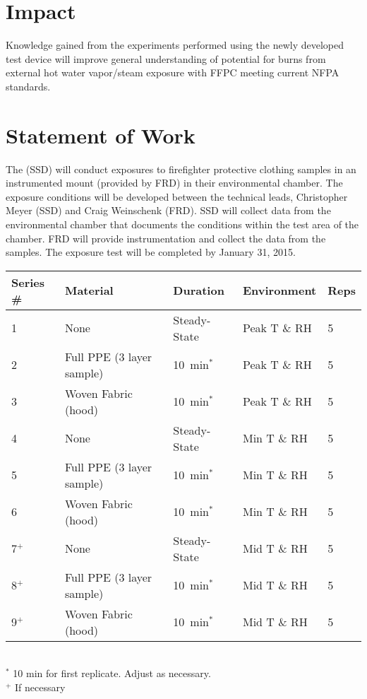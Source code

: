 \documentclass[12pt,letterpaper]{article}
\begin{document}
\section{Impact}

Knowledge gained from the experiments performed using the newly developed test device will improve general understanding of potential for burns from external hot water vapor/steam exposure with FFPC meeting current NFPA standards.  

\section{Statement of Work}

The (SSD) will conduct exposures to firefighter protective clothing samples in an instrumented mount (provided by FRD) in their environmental chamber.  The exposure conditions will be developed between the technical leads, Christopher Meyer (SSD) and Craig Weinschenk (FRD).   SSD will collect data from the environmental chamber that documents the conditions within the test area of the chamber.  FRD will provide instrumentation and collect the data from the samples.  The exposure test will be completed by January 31, 2015.  

\begin{table}
\centering
{}\label{tab:tests}
\begin{tabular}{lllll}
\toprule[1.5pt]
Series \#       &  Material                   &  Duration       &  Environment       &  Reps  \\
\midrule
1               &  None                       &  Steady-State   &  Peak T \& RH   &  5  \\[.25cm]
2               &  Full PPE (3 layer sample)  &  10~min$^*$     &  Peak T \& RH   &  5  \\[.25cm]
3               &  Woven Fabric (hood)        &  10~min$^*$     &  Peak T \& RH   &  5  \\[.25cm]
4               &  None                       &  Steady-State   &  Min T \& RH    &  5 \\[.25cm]
5               &  Full PPE (3 layer sample)  &  10~min$^*$     &  Min T \& RH    &  5  \\[.25cm]
6               &  Woven Fabric (hood)        &  10~min$^*$     &  Min T \& RH    &  5 \\[.25cm]
7$^+$           &  None                       &  Steady-State   &  Mid T \& RH    &  5 \\[.25cm]
8$^+$           &  Full PPE (3 layer sample)  &  10~min$^*$     &  Mid T \& RH    &  5 \\[.25cm]
9$^+$           &  Woven Fabric (hood)        &  10~min$^*$     &  Mid T \& RH    &  5 \\[.25cm]
\bottomrule[1.25pt]
\end{tabular}
\footnotesize
\raggedright
\\ $^*$ 10 min for first replicate. Adjust as necessary.
\\ $^+$ If necessary
\normalsize
\end{table}
\end{document}
